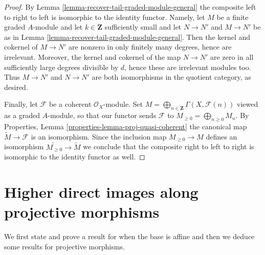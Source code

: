 \begin{proof}
\medskip\noindent
By Lemma \ref{lemma-recover-tail-graded-module-general}
the composite left to right to left is isomorphic to the identity functor.
Namely, let $M$ be a finite graded $A$-module and let
$k \in \mathbf{Z}$ sufficiently small and let
$N \to N'$ and $M \to N'$ be as in
Lemma \ref{lemma-recover-tail-graded-module-general}.
Then the kernel and cokernel of $M \to N'$ are nonzero in
only finitely many degrees, hence are irrelevant. Moreover, the
kernel and cokernel of the map $N \to N'$ are zero in all sufficiently
large degrees divisible by $d$, hence these are irrelevant modules too.
Thus $M \to N'$ and $N \to N'$ are both isomorphisms in the quotient
category, as desired.

\medskip\noindent
Finally, let $\mathcal{F}$ be a coherent $\mathcal{O}_X$-module.
Set $M = \bigoplus_{n \in \mathbf{Z}} \Gamma(X, \mathcal{F}(n))$
viewed as a graded $A$-module, so that our functor sends $\mathcal{F}$ to
$M_{\geq 0} = \bigoplus_{n \geq 0} M_n$.
By Properties, Lemma \ref{properties-lemma-proj-quasi-coherent}
the canonical map $\widetilde M \to \mathcal{F}$
is an isomorphism. Since the inclusion map
$M_{\geq 0} \to M$ defines an isomorphism
$\widetilde{M_{\geq 0}} \to \widetilde M$ we conclude that
the composite right to left to right is isomorphic to the identity
functor as well.
\end{proof}










\section{Higher direct images along projective morphisms}
\label{section-projective-pushforward}

\noindent
We first state and prove a result for when the base is affine
and then we deduce some results for projective morphisms.

